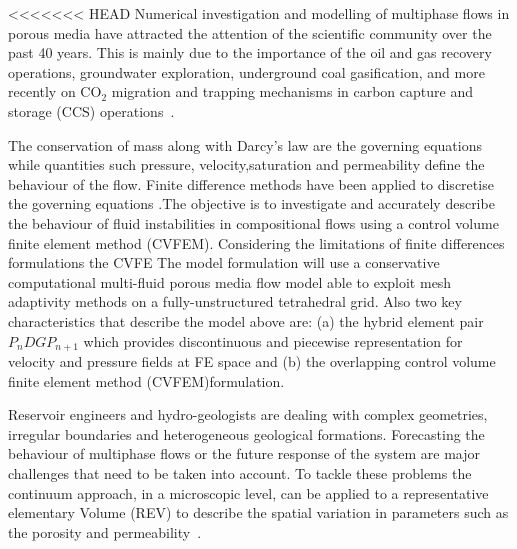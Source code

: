 \documentclass[preprint,authoryear,12pt]{elsarticle}
\newcommand{\red}{\textcolor{red}}
\begin{document}

<<<<<<< HEAD
Numerical investigation and modelling of multiphase flows in porous media have attracted the attention of the scientific community over the past 40 years. This is mainly due to the importance of the oil and gas recovery operations, groundwater exploration, underground coal gasification, and more recently on CO$_{\text{2}}$ migration and trapping mechanisms in carbon capture and storage (CCS) operations~\citep{spycher_2003, chen_2006, self_2012, pruess_1990c, white_1981,jiang_2011}.

The conservation of mass along with Darcy's law are the governing equations while quantities such pressure, velocity,saturation and permeability define the  behaviour of the flow. Finite difference methods have been applied to discretise the governing equations \citep{Luo2016,Moortgat2016,Hoteit2008} .The objective is to investigate and accurately describe the behaviour of fluid instabilities in compositional flows using a control volume finite element method (CVFEM). Considering the limitations of finite differences formulations the CVFE The model formulation will use a conservative computational multi-fluid porous media flow model
able to exploit mesh adaptivity methods on a fully-unstructured tetrahedral grid. Also two key characteristics that describe the model above are: (a) the hybrid element pair $P_{n}DGP_{n+1}$ which provides discontinuous and piecewise representation for velocity and pressure fields at FE space and (b) the overlapping control volume finite element method (CVFEM)formulation.

Reservoir engineers and hydro-geologists are dealing with complex geometries, irregular boundaries and heterogeneous geological formations. Forecasting the behaviour of multiphase flows or the future response of the system are major challenges that need to be taken into account. 
To tackle these problems the continuum approach, in a microscopic level, can be applied to a representative elementary Volume (REV) to describe the spatial variation in parameters such as the porosity and permeability~\citep{bastian_phd1999}. %
\end{document}
